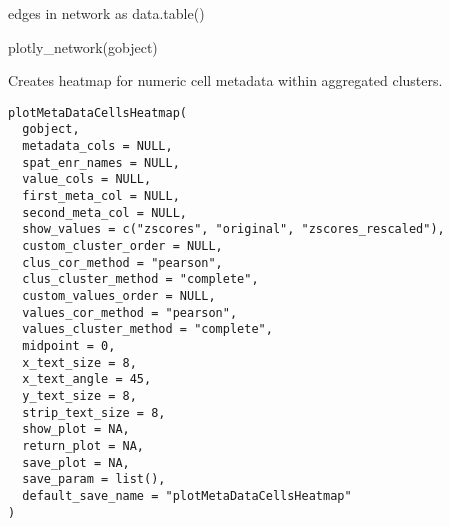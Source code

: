 \documentclass[a4paper]{book}
\begin{document}
%
\begin{Value}
edges in network as data.table()
\end{Value}
%
\begin{Examples}
\begin{ExampleCode}
    plotly_network(gobject)
\end{ExampleCode}
\end{Examples}
%
\begin{Description}\relax
Creates heatmap for numeric cell metadata within aggregated clusters.
\end{Description}
%
\begin{Usage}
\begin{verbatim}
plotMetaDataCellsHeatmap(
  gobject,
  metadata_cols = NULL,
  spat_enr_names = NULL,
  value_cols = NULL,
  first_meta_col = NULL,
  second_meta_col = NULL,
  show_values = c("zscores", "original", "zscores_rescaled"),
  custom_cluster_order = NULL,
  clus_cor_method = "pearson",
  clus_cluster_method = "complete",
  custom_values_order = NULL,
  values_cor_method = "pearson",
  values_cluster_method = "complete",
  midpoint = 0,
  x_text_size = 8,
  x_text_angle = 45,
  y_text_size = 8,
  strip_text_size = 8,
  show_plot = NA,
  return_plot = NA,
  save_plot = NA,
  save_param = list(),
  default_save_name = "plotMetaDataCellsHeatmap"
)
\end{verbatim}
\end{Usage}
%
\end{document}
